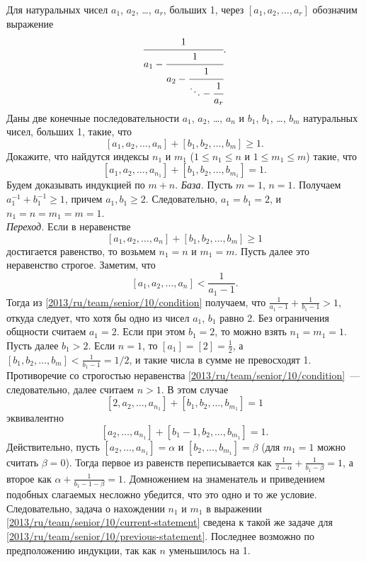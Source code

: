 \problem{}
Для натуральных чисел $a_1$, $a_2$, \ldots, $a_r$, больших 1, через
$[a_1, a_2, \ldots, a_r]$ обозначим выражение
\[
    \cfrac{1}{
        a_1 - \cfrac{1}{
            a_2 - \cfrac{1}{
                \ddots - \cfrac{1}{a_r} } } }
.\]
Даны две конечные последовательности
$a_1$, $a_2$, \ldots, $a_n$ и $b_1$, $b_1$, \ldots, $b_m$
натуральных чисел, больших 1, такие, что
\[
    [a_1, a_2, \ldots, a_n] + [b_1, b_2, \ldots, b_m] \geq 1
.\]
Докажите, что найдутся индексы $n_1$ и $m_1$
($1 \leq n_1 \leq n$ и $1 \leq m_1 \leq m$)
такие, что
\[
    [a_1, a_2, \ldots, a_{n_1}] + [b_1, b_2, \ldots, b_{m_1}] = 1
.\]
\solution
Будем доказывать индукцией по $m + n$.
\emph{База.}
Пусть $m = 1$, $n = 1$.
Получаем $a_1^{-1} + b_1^{-1} \geq 1$, причем $a_1, b_1 \geq 2$.
Следовательно, $a_1 = b_1 = 2$, и $n_1 = n = m_1 = m = 1$.
\\
\emph{Переход.}
Если в неравенстве
\begin{equation}\label{2013/ru/team/senior/10/condition}
    [a_1, a_2, \ldots, a_n] + [b_1, b_2, \ldots, b_m] \geq 1
\end{equation}
достигается равенство, то возьмем $n_1 = n$ и $m_1 = m$.
Пусть далее это неравенство строгое.
Заметим, что
\[
    [a_1, a_2, \ldots, a_n] < \frac{1}{a_1 - 1}
.\]
Тогда из \eqref{2013/ru/team/senior/10/condition} получаем, что
$\frac{1}{a_1 - 1} + \frac{1}{b_1 - 1} > 1$, откуда следует, что хотя бы одно
из чисел $a_1$, $b_1$ равно 2.
Без ограничения общности считаем $a_1 = 2$.
Если при этом $b_1 = 2$, то можно взять $n_1 = m_1 = 1$.
Пусть далее $b_1 > 2$.
Если $n = 1$, то $[a_1] = [2] = \frac{1}{2}$,
а $[b_1, b_2, \ldots, b_m] < \frac{1}{b_1 - 1} = 1/2$,
и такие числа в сумме не превосходят 1.
Противоречие со строгостью неравенства
\eqref{2013/ru/team/senior/10/condition}~--- следовательно, далее считаем
$n > 1$.
В этом случае
\begin{equation}\label{2013/ru/team/senior/10/current-statement}
    [2, a_2, \ldots, a_{n_1}] + [b_1, b_2, \ldots, b_{m_1}] = 1
\end{equation}
эквивалентно
\begin{equation}\label{2013/ru/team/senior/10/previous-statement}
    [a_2, \ldots, a_{n_1}] + [b_1 - 1, b_2, \ldots, b_{m_1}] = 1
.\end{equation}
Действительно, пусть $[a_2, \ldots, a_{n_1}] = \alpha$ и
$[b_2, \ldots, b_{m_1}] = \beta$ (для $m_1 = 1$ можно считать $\beta = 0$).
Тогда первое из равенств переписывается как
$\frac{1}{2 - \alpha} + \frac{1}{b_1 - \beta} = 1$,
а второе как $\alpha + \frac{1}{b_1 - 1 - \beta} = 1$.
Домножением на знаменатель и приведением подобных слагаемых несложно убедится,
что это одно и то же условие.
Следовательно, задача о нахождении $n_1$ и $m_1$ в выражении
\eqref{2013/ru/team/senior/10/current-statement} сведена к такой же задаче для
\eqref{2013/ru/team/senior/10/previous-statement}.
Последнее возможно по предположению индукции, так как $n$ уменьшилось на 1.
\endproblem

